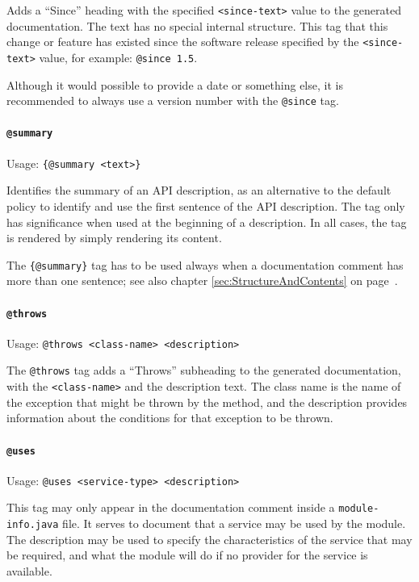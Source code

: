 \documentclass[11pt,a4paper, titlepage, parskip=half, headsepline, footsepline, cleardoublepage=current, headheight=1cm]{scrbook}
\newcommand*{\tqvref}[1]{\hyperref[{#1}]{\ref*{#1}} on page~\pageref{#1}}
\begin{document}
Adds a “Since” heading with the specified \verb#<since-text># value to the generated documentation. The text has no special internal structure. This tag that this change or feature has existed since the software release specified by the \verb#<since-text># value, for example: \lstinline|@since 1.5|.

Although it would possible to provide a date or something else, it is recommended to always use a version number with the \lstinline|@since| tag.

\paragraph{\lstinline|@summary|}\label{sec:TagSummary}  Usage:  \lstinline|{@summary <text>}|

Identifies  the summary of an API description, as an alternative to the default policy to identify and use the first sentence of the API description. The tag only has significance when used at the beginning of a description. In all cases, the tag is rendered by simply rendering its content.

The \lstinline|{@summary}| tag has to be used always when a documentation comment has more than one sentence; see also chapter \tqvref{sec:StructureAndContents}.

\paragraph{\lstinline|@throws|}\label{sec:TagThrows}  Usage: \lstinline|@throws <class-name> <description>|

The \lstinline|@throws| tag adds a “Throws” subheading to the generated documentation, with the \verb#<class-name># and the description text. The class name is the name of the exception that might be thrown by the method, and the description provides information about the conditions for that exception to be thrown. 

\paragraph{\lstinline|@uses|}\label{sec:TagUses}  Usage: \lstinline|@uses <service-type> <description>|

This tag may only appear in the documentation comment inside a \verb#module-info.java# file. It serves to document that a service may be used by the module. The description may be used to specify the characteristics of the service that may be required, and what the module will do if no provider for the service is available.
\end{document}
